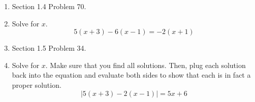 \documentclass[letterpaper,12pt,fleqn]{article}
\begin{document}
\begin{enumerate}
\newpage

\item Section 1.4 Problem 70.

\item Solve for $x$.
\[5(x+3)-6(x-1)=-2(x+1)\]

\item Section 1.5 Problem 34.

\item Solve for $x$. Make sure that you find all solutions. Then, plug each
solution back into the equation and evaluate both sides to show that each is
in fact a proper solution.
\[|5(x+3)-2(x-1)|=5x+6\]

\end{enumerate}
\end{document}
